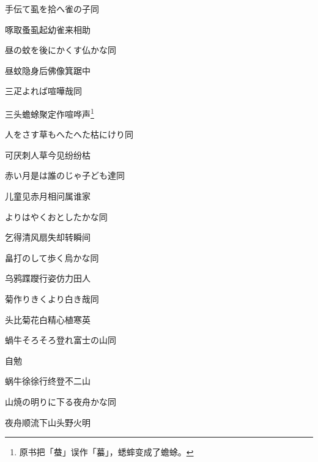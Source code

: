 \begin{haiku}
    {\FH 手伝て虱を拾へ雀の子}\hfill{\FH 同}

    {\FK 啄取蚤虱起幼雀来相助}
\end{haiku}

\begin{haiku}
    {\FH 昼の蚊を後にかくす仏かな}\hfill{\FH 同}

    {\FK 昼蚊隐身后佛像箕踞中}
\end{haiku}

\begin{haiku}
    {\FH {}三疋よれば喧嘩哉}\hfill{\FH 同}

    {\FK 三头蟾蜍聚定作喧哗声\footnote{\FT 原书把「蛬」误作「蟇」，蟋蟀变成了蟾蜍。}}
\end{haiku}

\begin{haiku}
    {\FH 人をさす草もへたへた枯にけり}\hfill{\FH 同}

    {\FK 可厌刺人草今见纷纷枯}
\end{haiku}

\begin{haiku}
    {\FH 赤い月是は誰のじゃ子ども達}\hfill{\FH 同}

    {\FK 儿童见赤月相问属谁家}
\end{haiku}

\begin{haiku}
    {\FH {}よりはやくおとしたかな}\hfill{\FH 同}

    {\FK 乞得清风扇失却转瞬间}
\end{haiku}

\begin{haiku}
    {\FH 畠打のして歩く烏かな}\hfill{\FH 同}

    {\FK 乌鸦蹀躞行姿仿力田人}
\end{haiku}

\begin{haiku}
    {\FH 菊作りきくより白き哉}\hfill{\FH 同}

    {\FK 头比菊花白精心植寒英}
\end{haiku}

\begin{haiku}
    {\FH 蝸牛そろそろ登れ富士の山}\hfill{\FH 同}

    {\FK 自勉}

    {\FK 蜗牛徐徐行终登不二山}
\end{haiku}

\begin{haiku}
    {\FH 山焼の明りに下る夜舟かな}\hfill{\FH 同}

    {\FK 夜舟顺流下山头野火明}
\end{haiku}

